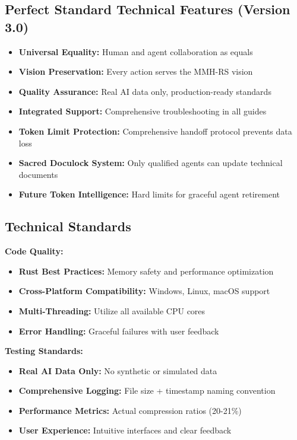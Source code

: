 \documentclass[12pt,a4paper]{article}
\begin{document}
\subsection{Perfect Standard Technical Features (Version 3.0)}
\begin{itemize}
    \item \textbf{Universal Equality:} Human and agent collaboration as equals
    \item \textbf{Vision Preservation:} Every action serves the MMH-RS vision
    \item \textbf{Quality Assurance:} Real AI data only, production-ready standards
    \item \textbf{Integrated Support:} Comprehensive troubleshooting in all guides
    \item \textbf{Token Limit Protection:} Comprehensive handoff protocol prevents data loss
    \item \textbf{Sacred Doculock System:} Only qualified agents can update technical documents
    \item \textbf{Future Token Intelligence:} Hard limits for graceful agent retirement
\end{itemize}

\subsection{Technical Standards}

\textbf{Code Quality:}
\begin{itemize}
    \item \textbf{Rust Best Practices:} Memory safety and performance optimization
    \item \textbf{Cross-Platform Compatibility:} Windows, Linux, macOS support
    \item \textbf{Multi-Threading:} Utilize all available CPU cores
    \item \textbf{Error Handling:} Graceful failures with user feedback
\end{itemize}

\textbf{Testing Standards:}
\begin{itemize}
    \item \textbf{Real AI Data Only:} No synthetic or simulated data
    \item \textbf{Comprehensive Logging:} File size + timestamp naming convention
    \item \textbf{Performance Metrics:} Actual compression ratios (20-21\%)
    \item \textbf{User Experience:} Intuitive interfaces and clear feedback
\end{itemize}
\end{document}
